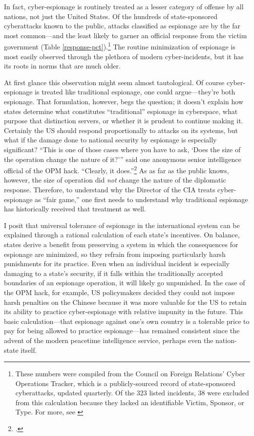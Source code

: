 \documentclass[14pt]{extarticle}
\begin{document}
In fact, cyber-espionage is routinely treated as a lesser category of offense by all nations, not just the United States. Of the hundreds of state-sponsored cyberattacks known to the public, attacks classified as espionage are by the far most common---and the least likely to garner an official response from the victim government (Table \ref{response-pct}).\footnote{These numbers were compiled from the Council on Foreign Relations' Cyber Operations Tracker, which is a publicly-sourced record of state-sponsored cyberattacks, updated quarterly. Of the 323 listed incidents, 38 were excluded from this calculation because they lacked an identifiable Victim, Sponsor, or Type. For more, see \cite{council_on_foreign_relations_new_2019}} The routine minimization of espionage is most easily observed through the plethora of modern cyber-incidents, but it has its roots in norms that are much older.

At first glance this observation might seem almost tautological. Of course cyber-espionage is treated like traditional espionage, one could argue---they're both espionage. That formulation, however, begs the question; it doesn't explain how states determine what constitutes \enquote{traditional} espionage in cyberspace, what purpose that distinction servers, or whether it is prudent to continue making it. Certainly the US should respond proportionally to attacks on its systems, but what if the damage done to national security by espionage is especially significant? ``This is one of those cases where you have to ask, `Does the size of the operation change the nature of it?'\thinspace'' said one anonymous senior intelligence official of the OPM hack. \enquote{Clearly, it does.}\footcite{sanger_u.s._2015} As as far as the public knows, however, the size of operation did \emph{not} change the nature of the diplomatic response. Therefore, to understand why the Director of the CIA treats cyber-espionage as \enquote{fair game,} one first needs to understand why traditional espionage has historically received that treatment as well.

I posit that universal tolerance of espionage in the international system can be explained through a rational calculation of each state's incentives. On balance, states derive a benefit from preserving a system in which the consequences for espionage are minimized, so they refrain from imposing particularly harsh punishments for its practice. Even when an individual incident is especially damaging to a state's security, if it falls within the traditionally accepted boundaries of an espionage operation, it will likely go unpunished. In the case of the OPM hack, for example, US policymakers decided they could not impose harsh penalties on the Chinese because it was more valuable for the US to retain its ability to practice cyber-espionage with relative impunity in the future. This basic calculation---that espionage against one's own country is a tolerable price to pay for being allowed to practice espionage---has remained consistent since the advent of the modern peacetime intelligence service, perhaps even the nation-state itself.
\end{document}
